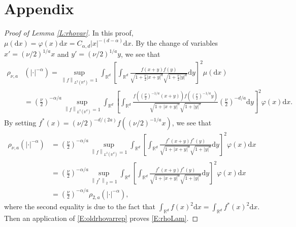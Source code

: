 \documentclass[12pt]{report}
\theoremstyle{plain}
\theoremstyle{definition}
\numberwithin{equation}{section}
\newcommand{\R}{\mathbb{R}}
\newcommand{\Norm}[1]{\left\|  #1   \right\|}
\newcommand{\ud}{\ensuremath{ \mathrm{d} }}
\begin{document}
\section{Appendix} \label{S:Appendix}

\begin{proof}[Proof of Lemma \ref{L:rhovar}]
	In this proof, $\mu(\ud x) = \varphi(x)\ud x = C_{\alpha,d}|x|^{-(d-\alpha)}\ud x$. By the change of
	variables $x' = \left(\nu/2\right)^{1/a} x$ and $y' = \left(\nu/2\right)^{1/a} y$, we see that
	\begin{align*}
	\rho_{\nu,a}
	& \left(|\cdot|^{-\alpha}\right) = \sup_{\Norm{f}_{L^2(\R^d)} =1} \int_{\R^d} \left[ \int_{\R^d} \frac{f(x+y)f(y)}{\sqrt{1+\frac{\nu}{2}|x+y|^a } \sqrt{1+\frac{\nu}{2}|y|^a} } \ud y \right]^2 \mu(\ud x) \\
	& = \left( \frac{\nu}{2} \right)^{-\alpha/a} \sup_{\Norm{f}_{L^2(\R^d)} =1} \int_{\R^d} \left[ \int_{\R^d} \frac{f\left(\left(\frac{\nu}{2}\right)^{-1/a}(x+y)\right)f\left(\left(\frac{\nu}{2}\right)^{-1/a}y\right)}{\sqrt{1+|x+y|^a } \sqrt{1+|y|^a} } \left(\frac{\nu}{2}\right)^{-d/a} \ud y \right]^2 \varphi(x)\ud x.
	\end{align*}
	By setting $f^*(x) =\left(\nu/2\right)^{-d/(2a)} f\left( \left(\nu/2\right)^{-1/a} x \right)$, we see that
	\begin{align*}
	\rho_{\nu,a} \left(|\cdot|^{-\alpha}\right)
	& = \left( \frac{\nu}{2} \right)^{-\alpha/a} \sup_{\Norm{f}_{L^2(\R^d)} =1} \int_{\R^d} \left[ \int_{\R^d} \frac{f^*\left(x+y\right)f^*\left(y\right)}{\sqrt{1+|x+y|^a } \sqrt{1+|y|^a} }  \ud y \right]^2 \varphi(x)\ud x \\
	& = \left( \frac{\nu}{2} \right)^{-\alpha/a}  \sup_{\Norm{f^*}_2 =1}  \int_{\R^d} \left[ \int_{\R^d} \frac{f^*\left(x+y\right)f^*\left(y\right)}{\sqrt{1+|x+y|^a } \sqrt{1+|y|^a} }  \ud y \right]^2 \varphi(x)\ud x       \\
	& = \left( \frac{\nu}{2} \right)^{-\alpha/a}  \rho_{2,a}\left(|\cdot|^{-\alpha}\right),
	\end{align*}
	where the second equality is due to the fact that $\int_{\R^d} f(x)^2 \ud x = \int_{\R^d} f^*(x)^2
	\ud x$.  Then an application of \eqref{E:oldrhovarrep} proves \eqref{E:rhoLam}.
	

\end{proof}
\end{document}

